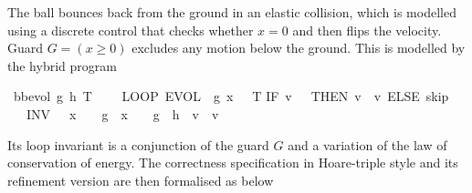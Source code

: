 \documentclass[envcountsame,envcountsect]{llncs}
\newcommand{\IF}[3]{\mathbf{if}\ #1\ \mathbf{then}\ #2\ \mathbf{else}\ #3}
\newcommand{\flow}{\varphi}
\newcommand{\reals}{\mathbb{R}}
\begin{document}
\begin{example}
The ball bounces back
from the ground in an elastic collision, which is modelled using a
discrete control that checks whether $x=0$ and then flips the
velocity.  Guard $G=(x\geq 0)$ excludes any motion
below the ground. This is modelled by the hybrid
program~\cite{Platzer18}
\begin{isabellebody}
\isanewline
{}\isamarkupfalse%
\ {\isachardoublequoteopen}bb{\isacharunderscore}evol\ g\ h\ T\ {\isasymequiv}\ \isanewline
\ \ {\isacharparenleft}LOOP\
{\isacharparenleft}{\isacharparenleft}EVOL\
{\isacharparenleft}{\isasymphi}\ g{\isacharparenright}\
{\isacharparenleft}x\ {\isasymge}\ {}{\isacharparenright}\
T{\isacharparenright}{\isacharsemicolon} {\isacharparenleft}IF\ {\isacharparenleft}v\ {\isacharequal}\ {}{\isacharparenright}\ THEN\ {\isacharparenleft}v\ {\isacharcolon}{\isacharcolon}{\isacharequal}\ {\isacharminus}v{\isacharparenright}\ ELSE\ skip{\isacharparenright}{\isacharparenright}\ \isanewline
\ \ \  INV\ {\isacharparenleft}{\isadigit{0}}\ {\isasymle}\ x\ {\isasymand}\ {}\ {\isasymcdot}\ g\ {\isasymcdot}\ x\ {\isacharequal}\ {}\ {\isasymcdot}\ g\ {\isasymcdot}\ h\ {\isacharplus}\ v\ {\isasymcdot}\ v{\isacharparenright}{\isacharparenright}{\isachardoublequoteclose}\isanewline
\end{isabellebody}
Its loop invariant is a conjunction of the guard $G$ and a variation of the law of conservation of energy. The correctness specification in Hoare-triple style and its refinement version are then formalised as below

\end{example}
\end{document}
